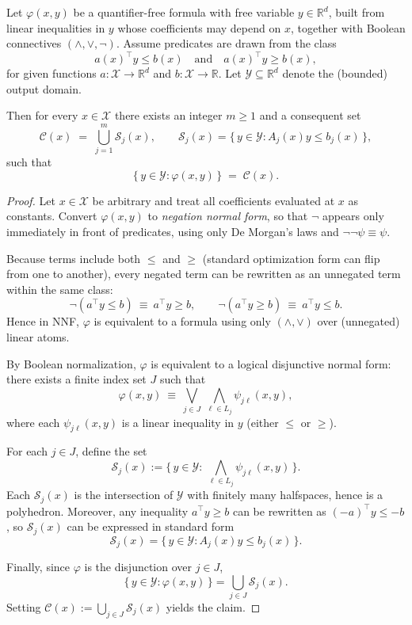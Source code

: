 \documentclass[10pt,a4paper]{amsart}
\begin{document}
\begin{theorem}
\label{thm:qf_subset_app}
Let $\varphi(x,y)$ be a quantifier-free formula with free variable $y\in\mathbb{R}^d$,
built from linear inequalities in $y$ whose coefficients may depend on $x$,
together with Boolean connectives $(\wedge,\vee,\neg)$.
Assume predicates are drawn from the class
\[
a(x)^\top y \le b(x)
\quad\text{and}\quad
a(x)^\top y \ge b(x),
\]
for given functions $a:\mathcal{X}\to\mathbb{R}^d$ and $b:\mathcal{X}\to\mathbb{R}$.
Let $\mathcal{Y}\subseteq\mathbb{R}^d$ denote the (bounded) output domain.

Then for every $x\in\mathcal{X}$ there exists an integer $m\ge 1$ and a consequent set
\[
\mathcal{C}(x) \;=\; \bigcup_{j=1}^m \mathcal{S}_j(x),
\qquad
\mathcal{S}_j(x)=\{\,y\in\mathcal{Y}:A_j(x)y\le b_j(x)\,\},
\]
such that
\[
\{\,y\in\mathcal{Y}:\varphi(x,y)\,\} \;=\; \mathcal{C}(x).
\]
\end{theorem}

\begin{proof}
Let $x\in\mathcal{X}$ be arbitrary and treat all coefficients evaluated at $x$ as constants.
Convert $\varphi(x,y)$ to \emph{negation normal form}, so that $\neg$ appears only
immediately in front of predicates, using only De Morgan's laws and $\neg\neg\psi\equiv\psi$.

Because terms include both $\le$ and $\ge$ (standard optimization form can flip from one to another), every negated term can be rewritten as an unnegated term
within the same class:
\[
\neg(a^\top y \le b)\ \equiv\ a^\top y \ge b,
\qquad
\neg(a^\top y \ge b)\ \equiv\ a^\top y \le b.
\]
Hence in NNF, $\varphi$ is equivalent to a formula using only $(\wedge,\vee)$ over (unnegated) linear atoms.

By Boolean normalization, $\varphi$ is equivalent to a logical disjunctive normal form:
there exists a finite index set $J$ such that
\[
\varphi(x,y)\ \equiv\ \bigvee_{j\in J}\ \bigwedge_{\ell\in L_j}\psi_{j\ell}(x,y),
\]
where each $\psi_{j\ell}(x,y)$ is a linear inequality in $y$ (either $\le$ or $\ge$).

For each $j\in J$, define the set
\[
\mathcal{S}_j(x)
:=
\Big\{\,y\in\mathcal{Y}:\ \bigwedge_{\ell\in L_j}\psi_{j\ell}(x,y)\,\Big\}.
\]
Each $\mathcal{S}_j(x)$ is the intersection of $\mathcal{Y}$ with finitely many halfspaces, hence is a polyhedron.
Moreover, any inequality $a^\top y \ge b$ can be rewritten as $(-a)^\top y \le -b$,
so $\mathcal{S}_j(x)$ can be expressed in standard form
\[
\mathcal{S}_j(x)=\{\,y\in\mathcal{Y}:A_j(x)y\le b_j(x)\,\}.
\]

Finally, since $\varphi$ is the disjunction over $j\in J$,
\[
\{\,y\in\mathcal{Y}:\varphi(x,y)\,\}
=
\bigcup_{j\in J}\mathcal{S}_j(x).
\]
Setting $\mathcal{C}(x):=\bigcup_{j\in J}\mathcal{S}_j(x)$ yields the claim.
\end{proof}
\end{document}
